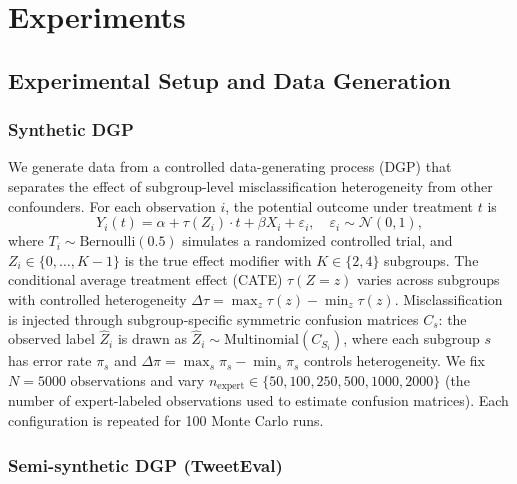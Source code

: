 \section{Experiments}

\subsection{Experimental Setup and Data Generation}

\subsubsection{Synthetic DGP}

We generate data from a controlled data-generating process (DGP) that separates the effect of subgroup-level misclassification heterogeneity from other confounders.
For each observation $i$, the potential outcome under treatment $t$ is
\begin{equation}
Y_i(t) = \alpha + \tau(Z_i) \cdot t + \beta X_i + \varepsilon_i, \quad \varepsilon_i \sim \mathcal{N}(0,1),
\end{equation}
where $T_i \sim \text{Bernoulli}(0.5)$ simulates a randomized controlled trial, and $Z_i \in \{0, \ldots, K{-}1\}$ is the true effect modifier with $K \in \{2, 4\}$ subgroups.
The conditional average treatment effect (CATE) $\tau(Z{=}z)$ varies across subgroups with controlled heterogeneity $\Delta\tau = \max_z \tau(z) - \min_z \tau(z)$.
Misclassification is injected through subgroup-specific symmetric confusion matrices $C_s$: the observed label $\hat{Z}_i$ is drawn as $\hat{Z}_i \sim \text{Multinomial}(C_{S_i})$, where each subgroup $s$ has error rate $\pi_s$ and $\Delta\pi = \max_s \pi_s - \min_s \pi_s$ controls heterogeneity.
We fix $N{=}5000$ observations and vary $n_{\text{expert}} \in \{50, 100, 250, 500, 1000, 2000\}$ (the number of expert-labeled observations used to estimate confusion matrices).
Each configuration is repeated for 100 Monte Carlo runs.

\subsubsection{Semi-synthetic DGP (TweetEval)}

